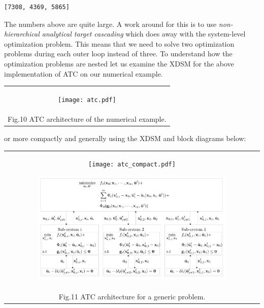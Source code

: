 \documentclass[11pt]{article}
\makeatletter
\newcommand{\boxspacing}{\kern\kvtcb@left@rule\kern\kvtcb@boxsep}
\newcommand{\prompt}[4]{
        {\ttfamily\llap{{\color{#2}[#3]:\hspace{3pt}#4}}\vspace{-\baselineskip}}
    }
\makeatother
\begin{document}
            \begin{tcolorbox}[breakable, size=fbox, boxrule=.5pt, pad at break*=1mm, opacityfill=0]
\prompt{Out}{outcolor}{12}{\boxspacing}
\begin{Verbatim}[commandchars=\\\{\}]
[7308, 4369, 5865]
\end{Verbatim}
\end{tcolorbox}
        
    The numbers above are quite large. A work around for this is to use
\emph{non-hierarchical analytical target cascading} which does away with
the system-level optimization problem. This means that we need to solve
two optimization problems during each outer loop instead of three. To
understand how the optimization problems are nested let us examine the
XDSM for the above implementation of ATC on our numerical example.

\begin{longtable}[]{@{}c@{}}
\toprule
\endhead
\begin{minipage}[t]{0.97\columnwidth}\centering
    \begin{figure}
        \centering
        \texttt{[image: atc.pdf]}
    \end{figure}
\end{minipage}\tabularnewline
Fig.10 ATC architecture of the numerical example.\tabularnewline
\bottomrule
\end{longtable}

or more compactly and generally using the XDSM and block diagrams below:

\begin{longtable}[]{@{}c@{}}
    \toprule
    \endhead
    \begin{minipage}[t]{0.97\columnwidth}\centering
        \begin{figure}
            \centering
            \texttt{[image: atc\_compact.pdf]}
        \end{figure}
        \begin{figure}
            \centering
            \includegraphics[width=0.9\textwidth]{images/ATC_diagram.png}
        \end{figure}
    \end{minipage}\tabularnewline
    Fig.11 ATC architecture for a generic problem.\tabularnewline
    \bottomrule
\end{longtable}


    
    
    
\end{document}

